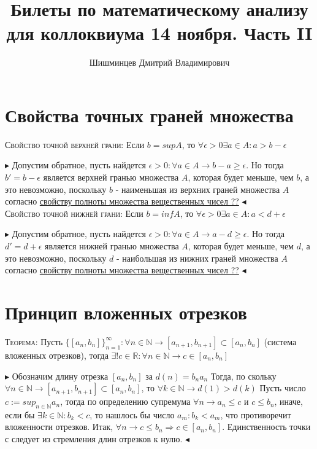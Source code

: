 \documentclass[14pt]{article}
\title{Билеты по математическому анализу для коллоквиума 14 ноября. Часть II }
\author{Шишминцев Дмитрий Владимирович}
\begin{document}
    \maketitle
    \tableofcontents
    \newpage
    
    \section{Свойства точных граней множества}
        \textsc{Свойство точной верхней грани:} Если $b = sup A$, то $\forall \epsilon > 0 \exists a \in A : a > b - \epsilon$

        $\blacktriangleright$ Допустим обратное, пусть найдется $\epsilon > 0 : \forall a \in A \rightarrow b - a \geqslant \epsilon$. Но тогда $b' = b - \epsilon$ является верхней гранью множества $A$, которая будет меньше, чем $b$, а это невозможно, поскольку $b$ - наименьшая из верхних граней множества $A$ согласно \underline{свойству полноты множества вещественных чисел ??} $\blacktriangleleft$ \\
        \textsc{Свойство точной нижней грани:} Если $b = inf A$, то $\forall \epsilon > 0 \exists a \in A : a < d + \epsilon$
        
        $\blacktriangleright$ Допустим обратное, пусть найдется $\epsilon > 0 : \forall a \in A \rightarrow a - d  \geqslant \epsilon$. Но тогда $d' = d + \epsilon$ является нижней гранью множества $A$, которая будет меньше, чем $d$, а это невозможно, поскольку $d$ - наибольшая из нижних граней множества $A$ согласно \underline{свойству полноты множества вещественных чисел ??} $\blacktriangleleft$ \\

    \section{Принцип вложенных отрезков}
        \textsc{Теорема:} Пусть $\{[a_n, b_n]\}^{\infty}_{n=1}:\forall n \in \mathbb{N} \rightarrow [a_{n+1}, b_{n+1}] \subset [a_n, b_n]$ (система вложенных отрезков),  тогда $\exists ! c \in \mathbb{R} : \forall n \in \mathbb{N} \rightarrow c \in [a_n, b_n]$

        $\blacktriangleright$ Обозначим длину отрезка $[a_n, b_n]$ за $d(n) = b_n a_n $ Тогда, по скольку $\forall n \in \mathbb{N} \rightarrow [a_{n+1}, b_{n+1}] \subset [a_n, b_n]$, то $\forall k \in \mathbb{N} \rightarrow d(1) > d(k)$ Пусть число $c:= sup_{n \in \mathbb{N}} a_n$, тогда по определению супремума $\forall n \rightarrow a_n \leqslant c $ и $c \leqslant b_n$, иначе, если бы $\exists k \in \mathbb{N} : b_k < c$, то нашлось бы число $a_m : b_k < a_m $, что противоречит вложенности отрезков. Итак, $\forall n \rightarrow c \leqslant b_n \Rightarrow c \in [a_n, b_n]$. Единственность точки с следует из стремления длин отрезков к нулю. $\blacktriangleleft$ \\
\end{document}
